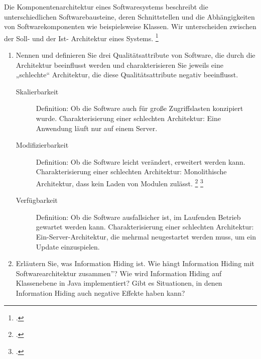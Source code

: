 \documentclass{bschlangaul-aufgabe}
\begin{document}

Die Komponentenarchitektur eines Softwaresystems beschreibt die
unterschiedlichen Softwarebausteine, deren Schnittstellen und die
Abhängigkeiten von Softwarekomponenten wie beispielsweise Klassen. Wir
unterscheiden zwischen der Soll- und der Ist- Architektur eines Systems.
\footcite{examen:66116:2019:09}

\begin{enumerate}


\item Nennen und definieren Sie drei Qualitätsattribute von
Software, die durch die Architektur beeinflusst werden und
charakterisieren Sie jeweils eine „schlechte“ Architektur, die diese
Qualitätsattribute negativ beeinflusst.

\begin{bAntwort}
\begin{description}
\item[Skalierbarkeit] Definition: Ob die Software auch für große
Zugriffslasten konzipiert wurde. Charakterisierung einer schlechten
Architektur: Eine Anwendung läuft nur auf einem Server.

\item[Modifizierbarkeit] Definition: Ob die Software leicht verändert,
erweitert werden kann. Charakterisierung einer schlechten Architektur:
Monolithische Architektur, dass kein Laden von Modulen zulässt.
\footcite[Seite 200]{schatten}
\footcite{wiki:softwarearchitektur}

\item[Verfügbarkeit] Definition: Ob die Software ausfallsicher ist, im
Laufenden Betrieb gewartet werden kann.  Charakterisierung einer
schlechten Architektur: Ein-Server-Architektur, die mehrmal neugestartet
werden muss, um ein Update einzuspielen.

\end{description}
\end{bAntwort}


\item Erläutern Sie, was Information Hiding ist. Wie hängt
Information Hiding mit Softwarearchitektur zusammen”? Wie wird
Information Hiding auf Klassenebene in Java implementiert? Gibt es
Situationen, in denen Information Hiding auch negative Effekte haben
kann?


\end{enumerate}
\end{document}
